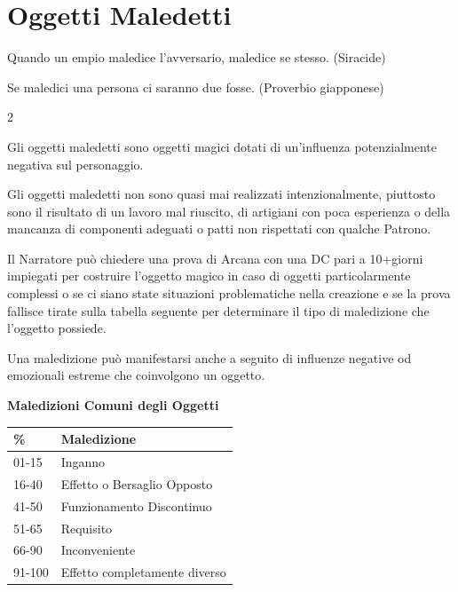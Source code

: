 \section{Oggetti Maledetti}

\begin{enfasi}{Quando un empio maledice l'avversario, maledice se stesso. (Siracide)

\medskip

Se maledici una persona ci saranno due fosse. (Proverbio giapponese)}
\end{enfasi}

\begin{multicols}{2}

\label{oggetti-maledetti}

Gli oggetti maledetti sono oggetti magici dotati di un'influenza potenzialmente negativa sul personaggio.

Gli oggetti maledetti non sono quasi mai realizzati intenzionalmente, piuttosto sono il risultato di un lavoro mal riuscito, di artigiani con poca esperienza o della mancanza di componenti adeguati o patti non rispettati con qualche Patrono.

Il Narratore può chiedere una prova di Arcana con una DC pari a 10+giorni impiegati per costruire l'oggetto magico in caso di oggetti particolarmente complessi o se ci siano state situazioni problematiche nella creazione e se la prova fallisce tirate sulla tabella seguente per determinare il tipo di maledizione che l'oggetto possiede.

Una maledizione può manifestarsi anche a seguito di influenze negative od emozionali estreme che coinvolgono un oggetto.

\medskip

\textbf{Maledizioni Comuni degli Oggetti}

\medskip

\noindent\begin{tabularx}{\linewidth}{ll}
	\toprule
\rowcolor{gray!20}\textbf{\%} & \textbf{Maledizione}\\
\toprule
01-15 & Inganno\\
\rowcolor{gray!20}16-40 & Effetto o Bersaglio Opposto\\
41-50 & Funzionamento Discontinuo\\
\rowcolor{gray!20}51-65 & Requisito\\
66-90 & Inconveniente\\
\rowcolor{gray!20}91-100& Effetto completamente diverso
\end{tabularx}


\end{multicols}
